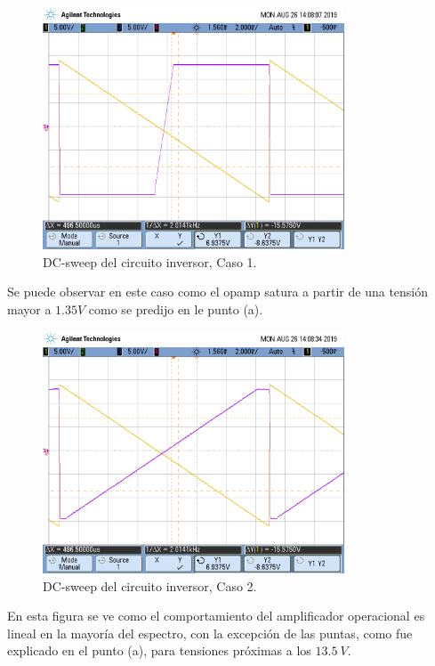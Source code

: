 \begin{figure}[H]	
	\centering
	\includegraphics[width=0.8\textwidth, trim = {0 3.3cm 0 2cm},clip]{Ejercicio1/Imagenes/dc_sweep_c1.png}
	\caption{DC-sweep del circuito inversor, Caso 1.}
	\label{fig:dcc1}
\end{figure} 
Se puede observar en este caso como el opamp satura a partir de una tensión mayor a $1.35 V$ como se predijo en le punto (a).
\begin{figure}[H]	
	\centering
	\includegraphics[width=0.8\textwidth, trim = {0 3.3cm 0 2cm},clip]{Ejercicio1/Imagenes/dc_sweep_c2.png}
	\caption{DC-sweep del circuito inversor, Caso 2.}
	\label{fig:dcc2}
\end{figure} 
En esta figura se ve como el comportamiento del amplificador operacional es lineal en la mayoría del espectro, con la excepción de las puntas, como fue explicado en el punto (a), para tensiones próximas a los $ 13.5 \ V$.
